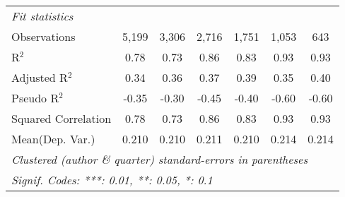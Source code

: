 \begin{tabular}{lcccccc}
   \midrule
   \emph{Fit statistics}\\
   Observations                                               & 5,199          & 3,306          & 2,716        & 1,751    & 1,053         & 643\\  
   R$^2$                                                      & 0.78           & 0.73           & 0.86         & 0.83     & 0.93          & 0.93\\  
   Adjusted R$^2$                                             & 0.34           & 0.36           & 0.37         & 0.39     & 0.35          & 0.40\\  
   Pseudo R$^2$                                               & -0.35          & -0.30          & -0.45        & -0.40    & -0.60         & -0.60\\  
   Squared Correlation                                        & 0.78           & 0.73           & 0.86         & 0.83     & 0.93          & 0.93\\  
Mean(Dep. Var.) & 0.210 & 0.210 & 0.211 & 0.210 & 0.214 & 0.214 \\
   \midrule \midrule
   \multicolumn{7}{l}{\emph{Clustered (author \& quarter) standard-errors in parentheses}}\\
   \multicolumn{7}{l}{\emph{Signif. Codes: ***: 0.01, **: 0.05, *: 0.1}}\\
\end{tabular}
\par\endgroup
